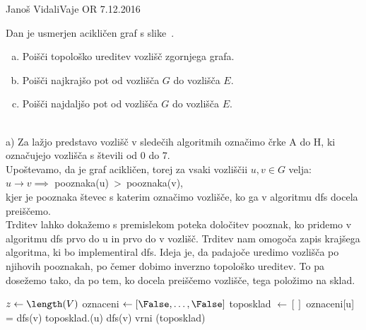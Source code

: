 \begin{naloga}{Janoš Vidali}{Vaje OR 7.12.2016}
\begin{vprasanje}
Dan je usmerjen acikličen graf s slike~\fig.

\begin{enumerate}[(a)]
\item Poišči topološko ureditev vozlišč zgornjega grafa.

\item Poišči najkrajšo pot od vozlišča $G$ do vozlišča $E$.

\item Poišči najdaljšo pot od vozlišča $G$ do vozlišča $E$.
\end{enumerate}

\begin{slika}
\pgfslika
{}
\end{slika}
\end{vprasanje}
\begin{odgovor}\\

\noindent a) Za lažjo predstavo vozlišč v sledečih algoritmih
označimo črke A do H, ki označujejo vozlišča s števili od 0 do 7.\\

\noindent Upoštevamo, da je graf acikličen, torej za vsaki vozliščii $u, v \in G$ velja: \\[5px]
$u \rightarrow v \implies $ pooznaka(u)\ \textgreater \ pooznaka(v), \\[5px]
kjer je pooznaka števec s katerim označimo vozlišče, ko ga v algoritmu dfs docela preiščemo.\\

\noindent Trditev lahko dokažemo s premislekom poteka določitev pooznak,
ko pridemo v algoritmu dfs prvo do u in prvo do v vozlišč.
Trditev nam omogoča zapis krajšega algoritma, ki bo implementiral dfs.
Ideja je, da padajoče uredimo vozlišča po njihovih pooznakah,
po čemer dobimo inverzno topološko ureditev.
To pa dosežemo tako, da po tem, ko docela preiščemo vozlišče, tega položimo na sklad. \\

\begin{algorithmic}
	\State $z \gets \length(V)$
	\State oznaceni $\gets [\False, \dots, \False]$
	\State toposklad $\gets []$
		\State oznaceni[u] = \True
				\State dfs(v)
			\EndIf
		\EndFor
		\State toposklad.\append(u)
	\EndFunction
			\State dfs(v)
		\EndIf
	\EndFor
	\State vrni \reverse(toposklad)
\EndFunction \\
\end{algorithmic}


\end{odgovor}
\end{naloga}
